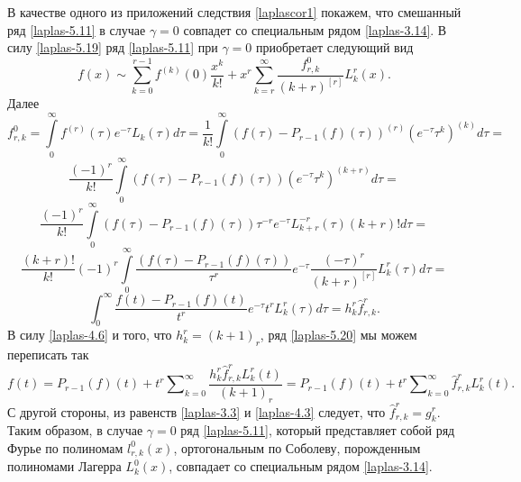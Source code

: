 В качестве одного из приложений следствия \ref{laplascor1} покажем, что
 смешанный ряд \eqref{laplas-5.11} в случае $\gamma=0$ совпадет со специальным рядом \eqref{laplas-3.14}.  В силу \eqref{laplas-5.19} ряд \eqref{laplas-5.11} при $\gamma=0$ приобретает следующий вид
\begin{equation}\label{laplas-5.20}
f(x)\sim \sum_{k=0}^{r-1} f^{(k)}(0)\frac{x^k}{k!}+ x^{r}\sum_{k=r}^\infty  \frac{f_{r,k}^0}{(k+r)^{[r]}} L_{k}^{r}(x).
\end{equation}
Далее
\begin{equation*}
  {f}_{r,k}^0=\int\limits_0^\infty f^{(r)}(\tau)e^{-\tau}L_k(\tau)d\tau=\frac1{k!}\int\limits_0^\infty(f(\tau)-P_{r-1}(f)(\tau))^{(r)}(e^{-\tau}\tau^k)^{(k)}d\tau=
\end{equation*}
\begin{equation*}
  \frac{(-1)^r}{k!}\int\limits_0^\infty(f(\tau)-P_{r-1}(f)(\tau))(e^{-\tau}\tau^k)^{(k+r)}d\tau=
\end{equation*}
\begin{equation*}
  \frac{(-1)^r}{k!}\int\limits_0^\infty(f(\tau)-P_{r-1}(f)(\tau))\tau^{-r}e^{-\tau}L_{k+r}^{-r}(\tau)(k+r)!d\tau=
\end{equation*}
\begin{equation*}
  \frac{(k+r)!}{k!}(-1)^r\int\limits_0^\infty\frac{(f(\tau)-P_{r-1}(f)(\tau))}{\tau^r}e^{-\tau}\frac{(-\tau)^r}{(k+r)^{[r]}}L_k^r(\tau)d\tau=
\end{equation*}
\begin{equation}\label{laplas-4.6}
  \int_0^\infty\frac{f(t)-P_{r-1}(f)(t)}{t^r}e^{-\tau}t^rL_k^r(\tau)d\tau=h_k^r\hat{f}_{r,k}^r.
\end{equation}
В силу \eqref{laplas-4.6} и того, что  $h_k^r=(k+1)_r$, ряд \eqref{laplas-5.20} мы можем переписать так
\begin{equation*}
  f(t)=P_{r-1}(f)(t)+t^r\sum\nolimits_{k=0}^\infty\frac{h_k^r\hat{f}_{r,k}^rL_k^r(t)}{(k+1)_r}=
  P_{r-1}(f)(t)+t^r\sum\nolimits_{k=0}^\infty\hat{f}_{r,k}^rL_k^r(t).
\end{equation*}
 С другой стороны, из равенств \eqref{laplas-3.3} и \eqref{laplas-4.3} следует, что $\hat{f}_{r,k}^r=g_k^r$. Таким образом, в случае $\gamma=0$ ряд  \eqref{laplas-5.11}, который представляет собой ряд Фурье по полиномам $l_{r,k}^{0}(x)$, ортогональным по Соболеву, порожденным полиномами Лагерра $L_k^0(x)$,   совпадает со специальным рядом \eqref{laplas-3.14}.




